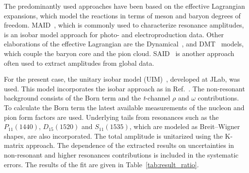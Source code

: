 \documentclass[aps,prl,twocolumn,superscriptaddress]{revtex4}
\begin{document}
The predominantly used approaches have been based on the effective Lagrangian 
expansions, which model the reactions in terms of meson and baryon degrees of 
freedom. MAID~\cite{bib:maid}, which is commonly used to characterize resonance 
amplitudes, is an isobar model approach for photo- and electroproduction data. 
Other elaborations of the effective Lagrangian are the 
Dynamical~\cite{bib:sato-lee}, and DMT~\cite{bib:DMT} models, which couple the 
baryon core and the pion cloud. SAID~\cite{bib:said} is another approach  often 
used to extract amplitudes from global data. 

For the present case, the  unitary isobar model (UIM)~\cite{bib:Inna}, developed 
at JLab, was used. This model incorporates the isobar approach as in 
Ref.~\cite{bib:maid}. The non-resonant background consists of the Born 
term and the {\it t}-channel $\rho$ and $\omega$ contributions. To calculate 
the Born term the latest available measurements of the nucleon and pion form 
factors are used. Underlying tails from resonances such as the $P_{11}(1440)$, 
$D_{15}(1520)$ and $S_{11}(1535)$, which are modeled as Breit--Wigner shapes, 
are also incorporated. The total amplitude is unitarized using the K-matrix 
approach. The dependence of the extracted results on uncertainties in 
non-resonant and higher resonances contributions is included in the systematic 
errors. The results of the fit are given in Table~\ref{tab:result_ratio}.
\end{document}
